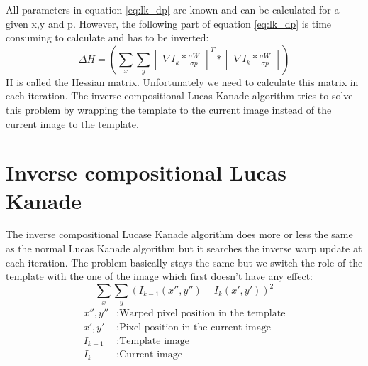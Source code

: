 \documentclass[11pt,a4paper,titlepage,oneside]{report}
\begin{document}
All parameters in equation \ref{eq:lk_dp} are known and can be calculated for a given x,y and p. However, the following part of equation \ref{eq:lk_dp} is time consuming to calculate and has to be inverted:
\begin{equation}
  \Delta H=(\sum_x\sum_y\begin{bmatrix}\nabla I_{k}*\frac{\sigma W}{\sigma p}\end{bmatrix}^T*\begin{bmatrix}\nabla I_{k}*\frac{\sigma W}{\sigma p}\end{bmatrix})
\end{equation}
H is called the Hessian matrix. Unfortunately we need to calculate this matrix in each iteration. The inverse compositional Lucas Kanade algorithm tries to solve this problem by wrapping the template to the current image instead of the current image to the template.

\section{Inverse compositional Lucas Kanade}

The inverse compositional Lucase Kanade algorithm does more or less the same as the normal Lucas Kanade algorithm but it searches the inverse warp update at each iteration. The problem basically stays the same but we switch the role of the template with the one of the image which first doesn't have any effect:
\begin{equation}\label{eq:iclk_problem}
  \sum_x\sum_y(I_{k-1}(x'',y'')-I_{k}(x',y'))^2
\end{equation}
\begin{align*}
  x'',y''    &:  \text{Warped pixel position in the template}\\
  x',y'      &:  \text{Pixel position in the current image}\\
  I_{k-1}    &:  \text{Template image}\\
  I_{k}      &:  \text{Current image}
\end{align*}
\end{document}
